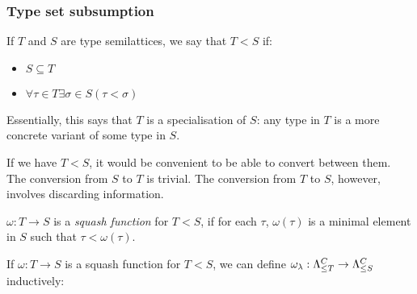 \documentclass[main.tex]{subfiles}
\begin{document}
\subsubsection{Type set subsumption}
\begin{defn}
    If $T$ and $S$ are type semilattices, we say that $T \less S$ if:
    \begin{itemize}
        \item $S \subseteq T$
        \item $\forall \tau \in T \exists \sigma \in S ( \tau \less \sigma )$
    \end{itemize}

    Essentially, this says that $T$ is a specialisation of $S$: any type in
    $T$ is a more concrete variant of some type in $S$.
\end{defn}

If we have $T \less S$, it would be convenient to be able to convert between them.
The conversion from $S$ to $T$ is trivial. The conversion from $T$ to $S$,
however, involves discarding information.


\begin{defn}
    $\omega: T \rightarrow S$ is a \emph{squash function} for $T \less S$, if
    for each $\tau$, $\omega(\tau)$ is a minimal element in $S$ such that
    $\tau \less \omega(\tau)$.
\end{defn}

\begin{defn}
    If $\omega: T \rightarrow S$ is a squash function for $T \less S$, we can define
    $\omega_{\lambda}: \fancylambda{T}{C} \rightarrow \fancylambda{S}{C}$ inductively:
\end{defn}
\end{document}
